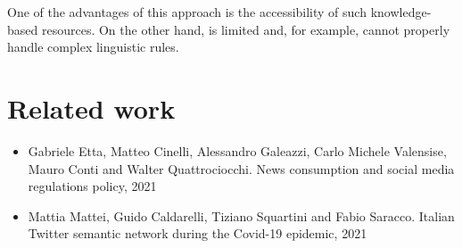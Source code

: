 One of the advantages of this approach is the accessibility of such knowledge-based resources. On the other hand, is limited and, for example, cannot properly handle complex linguistic rules.

\section{Related work}
\label{sec:related-work}

\begin{itemize}
	\item Gabriele Etta, Matteo Cinelli, Alessandro Galeazzi, Carlo Michele Valensise, Mauro Conti and Walter Quattrociocchi. News consumption and social media regulations policy, 2021
	\item Mattia Mattei, Guido Caldarelli, Tiziano Squartini and Fabio Saracco. Italian Twitter semantic network during the Covid-19 epidemic, 2021
\end{itemize}